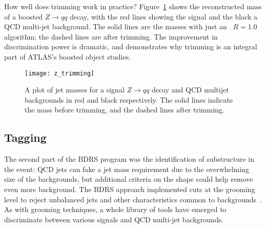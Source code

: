 
How well does trimming work in practice? Figure~\ref{fig:jets:z_trimming} shows the reconstructed mass of a boosted $Z\rightarrow qq$ decay, with the red lines showing the signal and the black a QCD multi-jet background. The solid lines are the masses with just an \antikt\ $R=1.0$ algorithm; the dashed lines are after trimming. The improvement in discrimination power is dramatic, and demonstrates why trimming is an integral part of ATLAS's boosted object studies.



\begin{figure}
\centering
\texttt{[image: z\_trimming]}
\caption{A plot of jet masses for a signal $Z\rightarrow qq$ decay and QCD multijet backgrounds in red and black respectively. The solid lines indicate the mass before trimming, and the dashed lines after trimming.}
\label{fig:jets:z_trimming}
\end{figure}



\subsection{Tagging}

The second part of the BDRS program was the identification of substructure in the event: QCD jets can fake a jet mass requirement due to the overwhelming size of the backgrounds, but additional criteria on the shape could help remove even more background. The BDRS approach implemented cuts at the grooming level to reject unbalanced jets and other characteristics common to backgrounds~\cite{BDRS}. As with grooming techniques, a whole library of tools have emerged to discriminate between various signals and QCD multi-jet backgrounds. 

